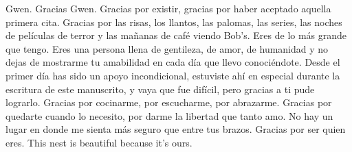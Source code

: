 Gwen. Gracias Gwen. Gracias por existir, gracias por haber aceptado aquella primera cita. Gracias por las risas, los llantos, las palomas, las series, las noches de películas de terror y las mañanas de café viendo Bob’s. Eres de lo más grande que tengo. Eres una persona llena de gentileza, de amor, de humanidad y no dejas de mostrarme tu amabilidad en cada día que llevo conociéndote. Desde el primer día has sido un apoyo incondicional, estuviste ahí en especial durante la escritura de este manuscrito, y vaya que fue difícil, pero gracias a ti pude lograrlo. Gracias por cocinarme, por escucharme, por abrazarme. Gracias por quedarte cuando lo necesito, por darme la libertad que tanto amo. No hay un lugar en donde me sienta más seguro que entre tus brazos. Gracias por ser quien eres. This nest is beautiful because it’s ours.

